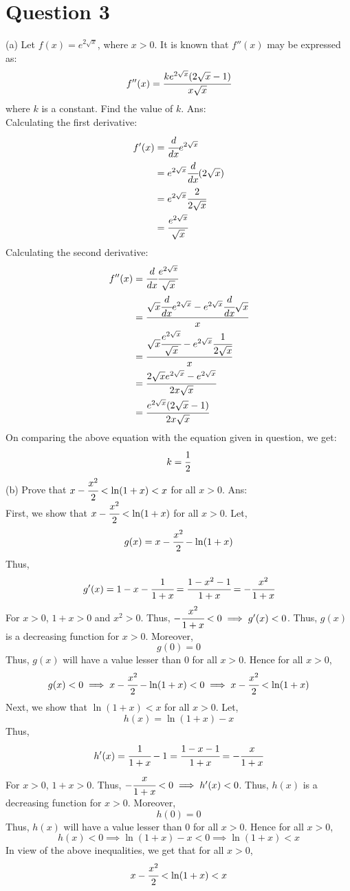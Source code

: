 \documentclass{article}
\begin{document}
\section*{Question 3}  
(a) Let $f(x) = e^{2\sqrt{x}}$, where $x > 0$. It is known that $f''(x)$ may be expressed as:
$$f''(x) = \cfrac{ke^{2\sqrt{x}}(2\sqrt{x}-1)}{x\sqrt{x}}$$
where $k$ is a constant. Find the value of $k$.  
\newline
\newline
Ans:
\\ Calculating the first derivative:
\begin{align*}
    f'(x)
    &= \cfrac{d}{dx} e^{2\sqrt{x}} \\
    &= e^{2\sqrt{x}} \cfrac{d}{dx} (2\sqrt{x})\\
    &= e^{2\sqrt{x}} \cfrac{2}{2\sqrt{x}}\\
    &= \cfrac{e^{2\sqrt{x}}}{\sqrt{x}}
\end{align*}
Calculating the second derivative:
\begin{align*}
    f''(x)
    &= \cfrac{d}{dx} \cfrac{e^{2\sqrt{x}}}{\sqrt{x}} \\
    &= \cfrac{\sqrt{x} \cfrac{d}{dx}e^{2\sqrt{x}} - e^{2\sqrt{x}}\cfrac{d}{dx} \sqrt{x} }{x} \\
    &= \cfrac{\sqrt{x} \cfrac{e^{2\sqrt{x}}}{\sqrt{x}} - e^{2\sqrt{x}}\cfrac{1}{2 \sqrt{x}} }{x} \\
    &= \cfrac{2\sqrt{x} e^{2\sqrt{x}} - e^{2\sqrt{x}}}{2x\sqrt{x}} \\
    &= \cfrac{ e^{2\sqrt{x}} (2\sqrt{x} - 1)}{2x\sqrt{x}} \\
\end{align*}
On comparing the above equation with the equation given in question, we get:
$$k = \cfrac{1}{2}$$
\newline
\newline
(b) Prove that $x-\cfrac{x^2}{2} < \ln (1+x) < x$ for all $x > 0$.
\newline
\newline
Ans:
\\ First, we show that $x-\cfrac{x^2}{2} < \ln (1+x)$ for all $x > 0$. Let,
$$g(x) = x-\cfrac{x^2}{2} - \ln (1+x)$$
Thus,
$$g'(x) = 1 - x - \cfrac{1}{1+x} = \cfrac{1-x^2 - 1}{1+x} = -\cfrac{x^2}{1+x}$$
For $x > 0$, $1 + x > 0$ and $x^2 > 0$. Thus, $-\cfrac{x^2}{1 + x} < 0 \implies g'(x) < 0$. Thus, $g(x)$ is a decreasing function for $x > 0$. Moreover,
$$g(0) = 0$$
Thus, $g(x)$ will have a value lesser than $0$ for all $x > 0$. Hence for all $x > 0$,
$$g(x) < 0 \implies x-\cfrac{x^2}{2} - \ln (1+x) < 0 \implies x-\cfrac{x^2}{2} < \ln (1+x)$$
Next, we show  that $\ln (1+x) < x$ for all $x > 0$. Let,
$$h(x) = \ln (1+x) - x$$
Thus,
$$h'(x) = \cfrac{1}{1+x} - 1 = \cfrac{1-x - 1}{1+x} = -\cfrac{x}{1+x}$$
For $x > 0$, $1 + x > 0$. Thus, $-\cfrac{x}{1 + x} < 0 \implies h'(x) < 0$. Thus, $h(x)$ is a decreasing function for $x > 0$. Moreover,
$$h(0) = 0$$
Thus, $h(x)$ will have a value lesser than $0$ for all $x > 0$. Hence for all $x > 0$,
$$h(x) < 0 \implies \ln (1+x) - x < 0 \implies \ln (1+x) < x$$
In view of the above inequalities, we get that for all $x > 0$,
$$x-\cfrac{x^2}{2} < \ln (1+x) < x$$
\end{document}
